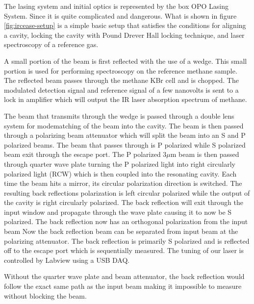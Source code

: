 \documentclass[11pt,a4paper]{book}
\newcommand{\imginput}[1]{} %
\begin{document}
		The lasing system and initial optics is represented by the box OPO Lasing System. Since it is quite complicated and dangerous. What is shown in figure \autoref{fig:ircease-setup} is a simple basic setup that satisfies the conditions for aligning a cavity, locking the cavity with Pound Drever Hall locking technique, and laser spectroscopy of a reference gas.
		
		A small portion of the beam is first reflected with the use of a wedge. This small portion is used for performing spectroscopy on the reference methane sample. The reflected beam passes through the methane KBr cell and is chopped. The modulated detection signal and reference signal of a few nanovolts is sent to a lock in amplifier which will output the IR laser absorption spectrum of methane.
		
		\begin{figure} [!ht]
			\centering
			\resizebox{160mm}{!}{\imginput{images/ircease-setup.pdf_tex}}
			\caption{}
			\label{fig:ircease-setup}
		\end{figure}
		
		The beam that transmits through the wedge is passed through a double lens system for modematching of the beam into the cavity. The beam is then passed through a polarizing beam attenuator which will split the beam into an S and P polarized beams. The beam that passes through is P polarized while S polarized beam exit through the escape port. The P polarized 3$\mu$m beam is then passed  through quarter wave plate turning the P polarized light into  right circularly polarized light (RCW) which is then coupled into the resonating cavity. Each time the beam hits a mirror, its circular polarization direction is switched. The resulting back reflections polarization is left circular polarized while the output of the cavity is right circularly polarized. The back reflection will exit through the input window and propagate through the wave plate causing it to now be S polarized. The back reflection now has an orthogonal polarization from the input beam Now the back reflection beam can be separated from input beam at the polarizing attenuator. The back reflection is primarily S polarized and is reflected off to the escape port which is sequentially measured.
		The tuning of our laser is controlled by Labview using a USB DAQ.
		
		Without the quarter wave plate and beam attenuator, the back reflection would follow the exact same path as the input beam making it impossible to measure without blocking the beam.
		
\end{document}
